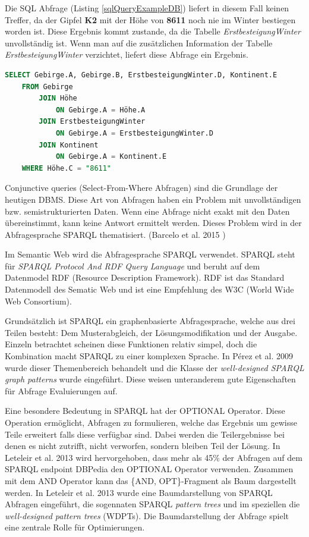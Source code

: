 \documentclass[draft,final]{vutinfth} %
\begin{document}
Die SQL Abfrage (Listing \ref{sqlQueryExampleDB}) liefert in diesem Fall keinen Treffer, da der Gipfel \textbf{K2} mit der Höhe von \textbf{8611} noch nie im Winter bestiegen worden ist. Diese Ergebnis kommt zustande, da die Tabelle \textit{ErstbesteigungWinter} unvollständig ist. Wenn man auf die zusätzlichen Information der Tabelle \textit{ErstbesteigungWinter} verzichtet, liefert diese Abfrage ein Ergebnis.

\begin{lstlisting}[language=SQL,caption={SELECT DB Beispiel},frame = single,label={sqlQueryExampleDB}]
SELECT Gebirge.A, Gebirge.B, ErstbesteigungWinter.D, Kontinent.E
	FROM Gebirge 
		JOIN Höhe
			ON Gebirge.A = Höhe.A
		JOIN ErstbesteigungWinter 
			ON Gebirge.A = ErstbesteigungWinter.D
		JOIN Kontinent
			ON Gebirge.A = Kontinent.E
	WHERE Höhe.C = "8611"
\end{lstlisting}

Conjunctive queries (Select-From-Where Abfragen) sind die Grundlage der heutigen DBMS. Diese Art von Abfragen haben ein Problem mit unvollständigen bzw. semistrukturierten Daten. Wenn eine Abfrage nicht exakt mit den Daten übereinstimmt, kann keine Antwort ermittelt werden. Dieses Problem wird in der Abfragesprache SPARQL thematisiert. (Barcelo et al. 2015 \cite{DBLP:conf/pods/BarceloPS15}) 

Im Semantic Web wird die Abfragesprache SPARQL verwendet. SPARQL steht für \textit{SPARQL Protocol And RDF Query Language} und beruht auf dem Datenmodel RDF (Resource Description Framework). RDF ist das Standard Datenmodell des Sematic Web und ist eine Empfehlung des W3C (World Wide Web Consortium). 

Grundsätzlich ist SPARQL ein graphenbasierte Abfragesprache, welche aus drei Teilen besteht: Dem Musterabgleich, der Lösungsmodifikation und der Ausgabe. Einzeln betrachtet scheinen diese Funktionen relativ simpel, doch die Kombination macht SPARQL zu einer komplexen Sprache. In P{\'e}rez et al. 2009 \cite{PAG09} wurde dieser Themenbereich behandelt und die Klasse der \textit{well-designed SPARQL graph patterns} wurde eingeführt. Diese weisen unteranderem gute Eigenschaften für Abfrage Evaluierungen auf.

Eine besondere Bedeutung in SPARQL hat der OPTIONAL Operator. Diese Operation ermöglicht, Abfragen zu formulieren, welche das Ergebnis um gewisse Teile erweitert falls diese verfügbar sind. Dabei werden die Teilergebnisse bei denen es nicht zutrifft, nicht verworfen, sondern bleiben Teil der Lösung. In Leteleir et al. 2013 \cite{LPPS2013} wird hervorgehoben, dass mehr als 45\% der Abfragen auf dem SPARQL endpoint DBPedia den OPTIONAL Operator verwenden. Zusammen mit dem AND Operator kann das \{AND, OPT\}-Fragment als Baum dargestellt werden. In Leteleir et al. 2013 \cite{LPPS2013} wurde eine Baumdarstellung von SPARQL Abfragen eingeführt, die sogennaten SPARQL \textit{pattern trees} und im speziellen die \textit{well-designed pattern trees} (WDPTs). Die Baumdarstellung der Abfrage spielt eine zentrale Rolle für Optimierungen. 
\end{document}
